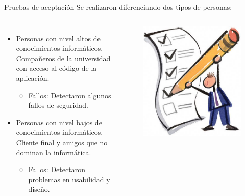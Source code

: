 \documentclass[spanish,xcolor=table,svgnames]{beamer}
\begin{document}
\begin{frame}{Pruebas de aceptación}
Se realizaron diferenciando dos tipos de personas:

\begin{columns}[c]
\begin{itemize}
\item Personas con nivel altos de conocimientos informáticos.\\
Compañeros de la universidad con acceso al código de la aplicación.
\begin{itemize}
\item Fallos: Detectaron algunos fallos de seguridad.
\end{itemize}
\item Personas con nivel bajos de conocimientos informáticos.\\
Cliente final y amigos que no dominan la informática.
\begin{itemize}
\item Fallos: Detectaron problemas en usabilidad y diseño.
\end{itemize}
\end{itemize}
  \begin{figure}[]
\includegraphics[scale=0.2]{pruebas}
\end{figure}
\end{columns}
\end{frame}
\end{document}
